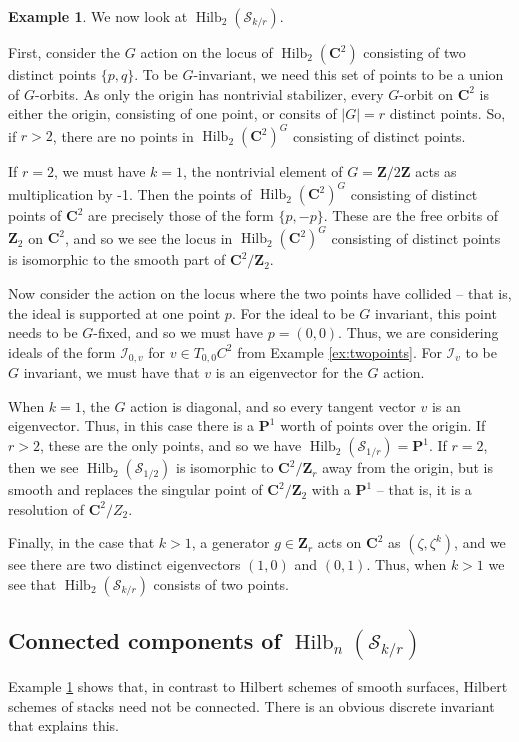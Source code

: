 \documentclass{amsart}[12pt]
\theoremstyle{definition}
\newtheorem{example}[dummy]{Example}
\newcommand{\Z}{\mathbf{Z}}
\newcommand{\C}{\mathbf{C}}
\newcommand{\II}{\mathcal{I}}
\newcommand{\proj}{\mathbf{P}}
\newcommand{\Sur}{\mathcal{S}}
\DeclareMathOperator{\Hilb}{Hilb}
\begin{document}
\begin{example} \label{ex:twopointsorbifold}
We now look at $\Hilb_2(\Sur_{k/r})$.  

First, consider the $G$ action on the locus of $\Hilb_2(\C^2)$ consisting of two distinct points $\{p, q\}$.  To be $G$-invariant, we need this set of points to be a union of $G$-orbits.   As only the origin has nontrivial stabilizer, every $G$-orbit on $\C^2$ is either the origin, consisting of one point, or consits of $|G|=r$ distinct points.  So, if $r>2$, there are no points in $\Hilb_2(\C^2)^G$ consisting of distinct points.  

If $r=2$, we must have $k=1$, the nontrivial element of $G=\Z/2\Z$ acts as multiplication by -1. Then the points of $\Hilb_2(\C^2)^G$ consisting of distinct points of $\C^2$ are precisely those of the form $\{p,-p\}$.  These are the free orbits of $\Z_2$ on $\C^2$, and so we see the locus in $\Hilb_2(\C^2)^G$ consisting of distinct points is isomorphic to the smooth part of $\C^2/\Z_2$.


Now consider the action on the locus where the two points have collided -- that is, the ideal is supported at one point $p$.  For the ideal to be $G$ invariant, this point needs to be $G$-fixed, and so we must have $p=(0,0)$.  Thus, we are considering ideals of the form $\II_{0, v}$ for $v\in T_{0,0}C^2$ from Example \ref{ex:twopoints}.  For $\II_{v}$ to be $G$ invariant, we must have that $v$ is an eigenvector for the $G$ action.

When $k=1$, the $G$ action is diagonal, and so every tangent vector $v$ is an eigenvector.  Thus, in this case there is a $\proj^1$ worth of points over the origin.  If $r>2$, these are the only points, and so we have $\Hilb_2(\Sur_{1/r})=\proj^1$.  If $r=2$, then we see $\Hilb_2(\Sur_{1/2})$ is isomorphic to $\C^2/\Z_r$ away from the origin, but is smooth and replaces the singular point of $\C^2/\Z_2$ with a $\proj^1$ -- that is, it is a resolution of $\C^2/Z_2$.

Finally, in the case that $k> 1$, a generator $g\in\Z_r$ acts on $\C^2$ as $(\zeta, \zeta^k)$, and we see there are two distinct eigenvectors $(1,0)$ and $(0,1)$.  Thus, when $k>1$ we see that $\Hilb_2(\mathcal{S}_{k/r})$ consists of two points.

\end{example}


\subsection{Connected components of $\Hilb_n(\Sur_{k/r})$}
Example \ref{ex:twopointsorbifold} shows that, in contrast to Hilbert schemes of smooth surfaces, Hilbert schemes of stacks need not be connected.   There is an obvious discrete invariant that explains this.
\end{document}
